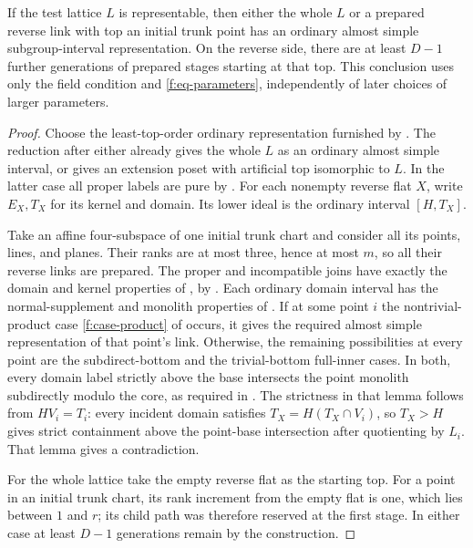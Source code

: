 \begin{theorem}\label{f:thm-almost-simple-reduction}
If the test lattice $L$ is representable, then either the whole $L$ or a
prepared reverse link with top an initial trunk point has an ordinary
almost simple subgroup-interval representation. On the reverse side,
there are at least $D-1$ further generations of prepared stages starting
at that top. This conclusion uses only the field condition and
\eqref{f:eq-parameters}, independently of later choices of larger
parameters.
\end{theorem}
\begin{proof}
Choose the least-top-order ordinary representation furnished by
. The reduction after
 either already gives the whole $L$ as an
ordinary almost simple interval, or gives an extension poset with
artificial top isomorphic to $L$. In the latter case all proper labels
are pure by . For each nonempty reverse flat $X$, write
$E_X,T_X$ for its kernel and domain. Its lower ideal is the ordinary
interval $[H,T_X]$.

Take an affine four-subspace of one initial trunk chart and consider all
its points, lines, and planes. Their ranks are at most three, hence at
most $m$, so all their reverse links are prepared. The proper and
incompatible joins have exactly the domain and kernel properties of
, by . Each ordinary domain
interval has the normal-supplement and monolith properties of
. If at some point $i$ the nontrivial-product case
\ref{f:case-product} of  occurs, it gives the
required almost simple representation of that point's link. Otherwise,
the remaining possibilities at every point are the subdirect-bottom and
the trivial-bottom full-inner cases. In both, every domain label strictly
above the base intersects the point monolith subdirectly modulo the core,
as required in . The strictness in that lemma follows
from $HV_i=T_i$: every incident domain satisfies
$T_X=H(T_X\cap V_i)$, so $T_X>H$ gives strict containment above the
point-base intersection after quotienting by $L_i$.
That lemma gives a contradiction.

For the whole lattice take the empty reverse flat as the starting top.
For a point in an initial trunk chart, its rank increment from the empty
flat is one, which lies between $1$ and $r$; its child path was therefore
reserved at the first stage. In either case at least $D-1$ generations
remain by the construction.
\end{proof}
